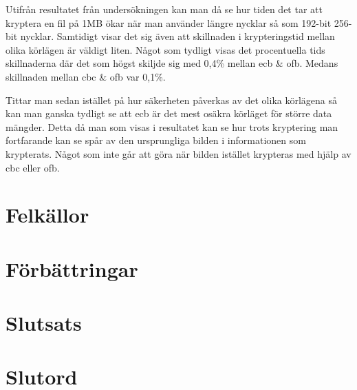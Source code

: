 \label{chap:discussion}

Utifrån resultatet från undersökningen kan man då se hur tiden det tar att kryptera en fil på 1MB ökar när man använder längre nycklar så som 192-\gls{bit} 256-\gls{bit} nycklar.
Samtidigt visar det sig även att skillnaden i krypteringstid mellan olika körlägen är väldigt liten. Något som tydligt visas det procentuella tids skillnaderna där
det som högst skiljde sig med 0,4\% mellan \acrshort{ecb} \& \acrshort{ofb}. Medans skillnaden mellan \acrshort{cbc} \& \acrshort{ofb} var 0,1\%.

Tittar man sedan istället på hur säkerheten påverkas av det olika körlägena så kan man ganska tydligt se att \acrshort{ecb} är det mest osäkra körläget för större data mängder.
Detta då man som visas i resultatet kan se hur trots kryptering man fortfarande kan se spår av den ursprungliga bilden i informationen som krypterats. Något som inte
går att göra när bilden istället krypteras med hjälp av \acrshort{cbc} eller \acrshort{ofb}.


\section{Felkällor} %


\section{Förbättringar} %


\section{Slutsats}


\section{Slutord}
